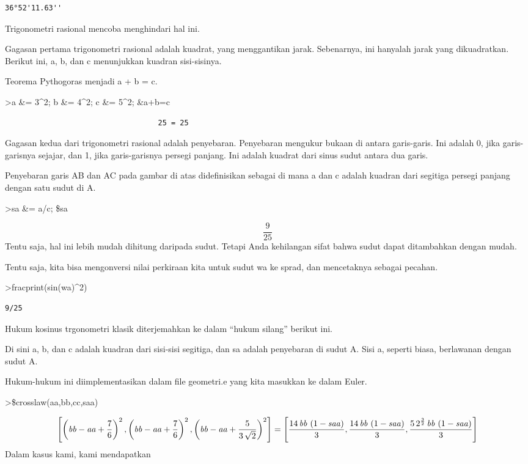 \documentclass[
]{book}
\begin{document}
\begin{verbatim}
36°52'11.63''
\end{verbatim}

Trigonometri rasional mencoba menghindari hal ini.

Gagasan pertama trigonometri rasional adalah kuadrat, yang menggantikan jarak. Sebenarnya, ini hanyalah jarak yang dikuadratkan. Berikut ini, a, b, dan c menunjukkan kuadran sisi-sisinya.

Teorema Pythogoras menjadi a + b = c.

\textgreater a \&= 3\^{}2; b \&= 4\^{}2; c \&= 5\^{}2; \&a+b=c

\begin{verbatim}
                                   25 = 25
\end{verbatim}

Gagasan kedua dari trigonometri rasional adalah penyebaran. Penyebaran mengukur bukaan di antara garis-garis. Ini adalah 0, jika garis-garisnya sejajar, dan 1, jika garis-garisnya persegi panjang. Ini adalah kuadrat dari sinus sudut antara dua garis.

Penyebaran garis AB dan AC pada gambar di atas didefinisikan sebagai di mana a dan c adalah kuadran dari segitiga persegi panjang dengan satu sudut di A.

\textgreater sa \&= a/c; \$sa

\[\frac{9}{25}\]Tentu saja, hal ini lebih mudah dihitung daripada sudut. Tetapi Anda kehilangan sifat bahwa sudut dapat ditambahkan dengan mudah.

Tentu saja, kita bisa mengonversi nilai perkiraan kita untuk sudut wa ke sprad, dan mencetaknya sebagai pecahan.

\textgreater fracprint(sin(wa)\^{}2)

\begin{verbatim}
9/25
\end{verbatim}

Hukum kosinus trgonometri klasik diterjemahkan ke dalam ``hukum silang'' berikut ini.

Di sini a, b, dan c adalah kuadran dari sisi-sisi segitiga, dan sa adalah penyebaran di sudut A. Sisi a, seperti biasa, berlawanan dengan sudut A.

Hukum-hukum ini diimplementasikan dalam file geometri.e yang kita masukkan ke dalam Euler.

\textgreater\$crosslaw(aa,bb,cc,saa)

\[\left[ \left({\it bb}-{\it aa}+\frac{7}{6}\right)^2 , \left(
 {\it bb}-{\it aa}+\frac{7}{6}\right)^2 , \left({\it bb}-{\it aa}+
 \frac{5}{3\,\sqrt{2}}\right)^2 \right] =\left[ \frac{14\,{\it bb}\,
 \left(1-{\it saa}\right)}{3} , \frac{14\,{\it bb}\,\left(1-{\it saa}
 \right)}{3} , \frac{5\,2^{\frac{3}{2}}\,{\it bb}\,\left(1-{\it saa}
 \right)}{3} \right] \]Dalam kasus kami, kami mendapatkan
\end{document}
